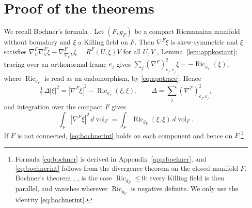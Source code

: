 \documentclass[11pt,reqno]{amsart}
\theoremstyle{plain}
\theoremstyle{definition}
\newcommand{\Ric}{\operatorname{Ric}}
\newcommand{\vol}{\operatorname{vol}}
\begin{document}
\section{Proof of the theorems}\label{sec:proof}

We recall Bochner's formula \cite{Bochner1946}. Let $(F,g_F)$ be a compact Riemannian manifold without boundary and $\xi$ a Killing field on $F$. Then $\nabla^F\xi$ is skew-symmetric and $\xi$ satisfies $\nabla^F_U\nabla^F_V\xi-\nabla^F_{\nabla^F_UV}\xi=R^F(U,\xi)V$ for all $U,V$ \cite{Kostant1955}, Lemma~\ref{lem:appkostant}; tracing over an orthonormal frame $e_j$ gives $\sum_j(\nabla^F)^2_{e_j,e_j}\xi=-\Ric_{g_F}(\xi)$, where $\Ric_{g_F}$ is read as an endomorphism, by \eqref{eq:apptrace}. Hence
\begin{equation}\label{eq:bochner}
\tfrac12\,\Delta|\xi|^2=|\nabla^F\xi|^2-\Ric_{g_F}(\xi,\xi),\qquad \Delta=\sum_j(\nabla^F)^2_{e_j,e_j},
\end{equation}
and integration over the compact $F$ gives
\begin{equation}\label{eq:bochnerint}
\int_F|\nabla^F\xi|^2\,d\vol_F=\int_F\Ric_{g_F}(\xi,\xi)\,d\vol_F .
\end{equation}
If $F$ is not connected, \eqref{eq:bochnerint} holds on each component and hence on $F$.\footnote{Formula \eqref{eq:bochner} is derived in Appendix~\ref{app:bochner}, and \eqref{eq:bochnerint} follows from the divergence theorem on the closed manifold $F$. Bochner's theorem \cite{Bochner1946}, \cite[Chapter II]{Kobayashi1972}, \cite{YanoBochner1953} is the case $\Ric_{g_F}\le0$: every Killing field is then parallel, and vanishes wherever $\Ric_{g_F}$ is negative definite. We only use the identity \eqref{eq:bochnerint}.}
\end{document}
